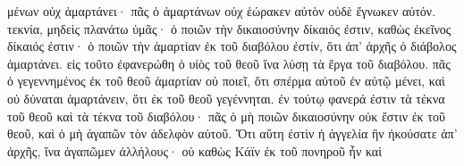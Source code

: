 \documentclass{openreader}
\begin{document}
μένων οὐχ ἁμαρτάνει· πᾶς ὁ ἁμαρτάνων οὐχ ἑώρακεν αὐτὸν οὐδὲ ἔγνωκεν αὐτόν. τεκνία, μηδεὶς πλανάτω ὑμᾶς· ὁ ποιῶν τὴν δικαιοσύνην δίκαιός ἐστιν, καθὼς ἐκεῖνος δίκαιός ἐστιν· ὁ ποιῶν τὴν ἁμαρτίαν ἐκ τοῦ διαβόλου ἐστίν, ὅτι ἀπ’ ἀρχῆς ὁ διάβολος ἁμαρτάνει. εἰς τοῦτο ἐφανερώθη ὁ υἱὸς τοῦ θεοῦ ἵνα λύσῃ τὰ ἔργα τοῦ διαβόλου. πᾶς ὁ γεγεννημένος ἐκ τοῦ θεοῦ ἁμαρτίαν οὐ ποιεῖ, ὅτι σπέρμα αὐτοῦ ἐν αὐτῷ μένει, καὶ οὐ δύναται ἁμαρτάνειν, ὅτι ἐκ τοῦ θεοῦ γεγέννηται. ἐν τούτῳ φανερά ἐστιν τὰ τέκνα τοῦ θεοῦ καὶ τὰ τέκνα τοῦ διαβόλου· πᾶς ὁ μὴ ποιῶν δικαιοσύνην οὐκ ἔστιν ἐκ τοῦ θεοῦ, καὶ ὁ μὴ ἀγαπῶν τὸν ἀδελφὸν αὐτοῦ. Ὅτι αὕτη ἐστὶν ἡ ἀγγελία ἣν ἠκούσατε ἀπ’ ἀρχῆς, ἵνα ἀγαπῶμεν ἀλλήλους· οὐ καθὼς Κάϊν ἐκ τοῦ πονηροῦ ἦν καὶ 
\end{document}

